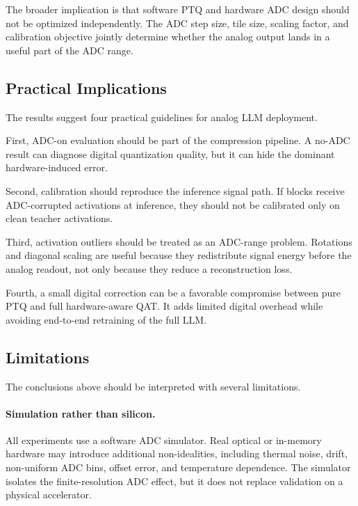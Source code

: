 \documentclass[a4paper,11pt,oneside]{article}
\theoremstyle{breakstyle}
\begin{document}
  The broader implication is that software PTQ and hardware ADC design
  should not be optimized independently.  The ADC step size, tile size,
  scaling factor, and calibration objective jointly determine whether the
  analog output lands in a useful part of the ADC range.

  \subsection{Practical Implications}

  The results suggest four practical guidelines for analog LLM
  deployment.

  First, ADC-on evaluation should be part of the compression pipeline.
  A no-ADC result can diagnose digital quantization quality, but it can
  hide the dominant hardware-induced error.

  Second, calibration should reproduce the inference signal path.  If
  blocks receive ADC-corrupted activations at inference, they should not
  be calibrated only on clean teacher activations.

  Third, activation outliers should be treated as an ADC-range problem.
  Rotations and diagonal scaling are useful because they redistribute
  signal energy before the analog readout, not only because they reduce
  a reconstruction loss.

  Fourth, a small digital correction can be a favorable compromise
  between pure PTQ and full hardware-aware QAT.  It adds limited digital
  overhead while avoiding end-to-end retraining of the full LLM.

  \subsection{Limitations}

  The conclusions above should be interpreted with several limitations.

  \paragraph{Simulation rather than silicon.}
  All experiments use a software ADC simulator.  Real optical or
  in-memory hardware may introduce additional non-idealities, including
  thermal noise, drift, non-uniform ADC bins, offset error, and
  temperature dependence.  The simulator isolates the finite-resolution
  ADC effect, but it does not replace validation on a physical
  accelerator.
\end{document}

